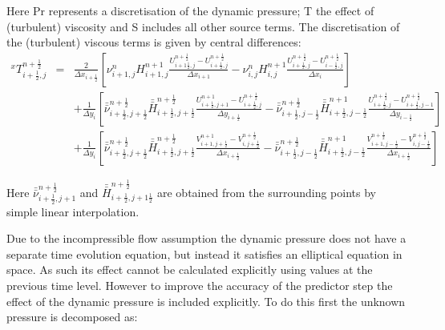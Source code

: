 \documentclass{article}
\begin{document}
\noindent Here Pr represents a discretisation of the dynamic pressure; T the effect of (turbulent) viscosity and S includes all other source terms. The discretisation of the (turbulent) viscous terms is given by central differences:
\begin{equation} \label{6.35)} 
\begin{array}{rcl} {{}^{x} T_{i+{\tfrac{1}{2}} ,j}^{n+{\tfrac{1}{2}} } } & {=} & {\frac{2}{\Delta x_{i+{\tfrac{1}{2}} } } \left[\nu _{i+1,j}^{n} H_{i+1,j}^{n+1} \frac{U_{i+1{\tfrac{1}{2}} ,j}^{n+{\tfrac{1}{2}} } -U_{i+{\tfrac{1}{2}} ,j}^{n+{\tfrac{1}{2}} } }{\Delta x_{i+1} } -\nu _{i,j}^{n} H_{i,j}^{n+1} \frac{U_{i+{\tfrac{1}{2}} ,j}^{n+{\tfrac{1}{2}} } -U_{i-{\tfrac{1}{2}} ,j}^{n+{\tfrac{1}{2}} } }{\Delta x_{i} } \right]} \\ {} & {} & {+\frac{1}{\Delta y_{i} } \left[\bar{\bar{\nu }}_{i+{\tfrac{1}{2}} ,j+{\tfrac{1}{2}} }^{n+{\tfrac{1}{2}} } \bar{\bar{H}}_{i+{\tfrac{1}{2}} ,j+{\tfrac{1}{2}} }^{n+{\tfrac{1}{2}} } \frac{U_{i+{\tfrac{1}{2}} ,j+1}^{n+1} -U_{i+{\tfrac{1}{2}} ,j}^{n+{\tfrac{1}{2}} } }{\Delta y_{i+{\tfrac{1}{2}} } } -\bar{\bar{\nu }}_{i+{\tfrac{1}{2}} ,j-{\tfrac{1}{2}} }^{n+{\tfrac{1}{2}} } \bar{\bar{H}}_{i+{\tfrac{1}{2}} ,j-{\tfrac{1}{2}} }^{n+1} \frac{U_{i+{\tfrac{1}{2}} ,j}^{n+{\tfrac{1}{2}} } -U_{i+{\tfrac{1}{2}} ,j-1}^{n+{\tfrac{1}{2}} } }{\Delta y_{i-{\tfrac{1}{2}} } } \right]} \\ {} & {} & {+\frac{1}{\Delta y_{i} } \left[\bar{\bar{\nu }}_{i+{\tfrac{1}{2}} ,j+{\tfrac{1}{2}} }^{n+{\tfrac{1}{2}} } \bar{\bar{H}}_{i+{\tfrac{1}{2}} ,j+{\tfrac{1}{2}} }^{n+{\tfrac{1}{2}} } \frac{V_{i+1,j+{\tfrac{1}{2}} }^{n+1} -V_{i,j+{\tfrac{1}{2}} }^{n+{\tfrac{1}{2}} } }{\Delta x_{i+{\tfrac{1}{2}} } } -\bar{\bar{\nu }}_{i+{\tfrac{1}{2}} ,j-{\tfrac{1}{2}} }^{n+{\tfrac{1}{2}} } \bar{\bar{H}}_{i+{\tfrac{1}{2}} ,j-{\tfrac{1}{2}} }^{n+1} \frac{V_{i+1,j-{\tfrac{1}{2}} }^{n+{\tfrac{1}{2}} } -V_{i,j-{\tfrac{1}{2}} }^{n+{\tfrac{1}{2}} } }{\Delta x_{i+{\tfrac{1}{2}} } } \right]} \end{array} 
\end{equation} 


\noindent Here $\bar{\bar{\nu }}_{i+{\tfrac{1}{2}} ,j+1}^{n+{\tfrac{1}{2}} } $ and $\bar{\bar{H}}_{i+{\tfrac{1}{2}} ,j+1{\tfrac{1}{2}} }^{n+{\tfrac{1}{2}} } $ are obtained from the surrounding points by simple linear interpolation.

\noindent 

\noindent Due to the incompressible flow assumption the dynamic pressure does not have a separate time evolution equation, but instead it satisfies an elliptical equation in space. As such its effect cannot be calculated explicitly using values at the previous time level. However to improve the accuracy of the predictor step the effect of the dynamic pressure is included explicitly. To do this first the unknown pressure is decomposed as:
\end{document}
